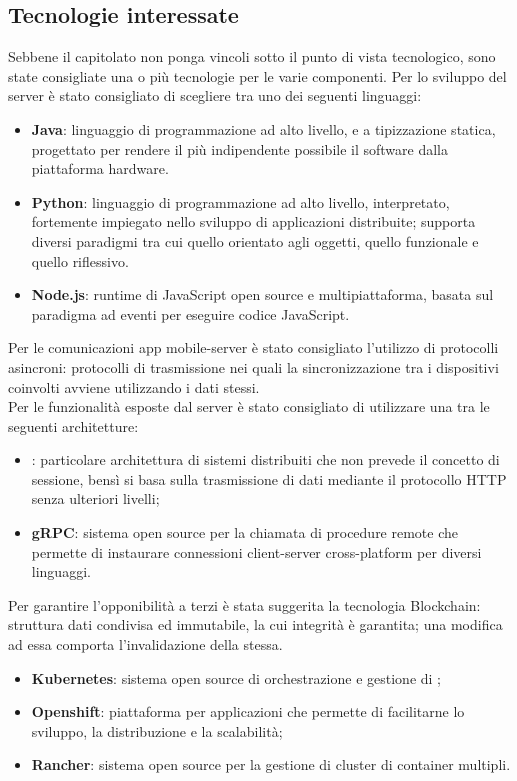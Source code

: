 \documentclass[../studio-di-fattibilita.tex]{subfiles}
\begin{document}
\subsection{Tecnologie interessate}%
\label{sub:c1_tecnologie_interessate}
Sebbene il capitolato non ponga vincoli sotto il punto di vista tecnologico, sono state consigliate una o più tecnologie per le varie componenti.
Per lo sviluppo del server è stato consigliato di scegliere tra uno dei seguenti linguaggi:
\begin{itemize}
  \item \textbf{Java}: linguaggio di programmazione ad alto livello,  e a tipizzazione statica, progettato per rendere il più indipendente possibile il software dalla piattaforma hardware.
  \item \textbf{Python}: linguaggio di programmazione ad alto livello, interpretato, fortemente impiegato nello sviluppo di applicazioni distribuite; supporta diversi paradigmi tra cui quello orientato agli oggetti, quello funzionale e quello riflessivo.
  \item \textbf{Node.js}: runtime di JavaScript open source e multipiattaforma, basata sul paradigma ad eventi per eseguire codice JavaScript.
\end{itemize}

Per le comunicazioni app mobile-server è stato consigliato l’utilizzo di protocolli asincroni: protocolli di trasmissione nei quali la sincronizzazione tra i dispositivi coinvolti avviene utilizzando i dati stessi. \\

Per le funzionalità esposte dal server è stato consigliato di utilizzare una tra le seguenti architetture:
\begin{itemize}
  \item \textbf{}: particolare architettura di sistemi distribuiti che non prevede il concetto di sessione, bensì si basa sulla trasmissione di dati mediante il protocollo HTTP senza ulteriori livelli;
  \item \textbf{gRPC}: sistema open source per la chiamata di procedure remote che permette di instaurare connessioni client-server cross-platform per diversi linguaggi.
\end{itemize}



Per garantire l’opponibilità a terzi è stata suggerita la tecnologia Blockchain: struttura dati condivisa ed immutabile, la cui integrità è garantita; una modifica ad essa comporta l’invalidazione della stessa.
\begin{itemize}
  \item \textbf{Kubernetes}: sistema open source di orchestrazione e gestione di ;
  \item \textbf{Openshift}: piattaforma per applicazioni  che permette di facilitarne lo sviluppo, la distribuzione e la scalabilità;
  \item \textbf{Rancher}: sistema open source per la gestione di cluster di container multipli.
\end{itemize}
\end{document}
